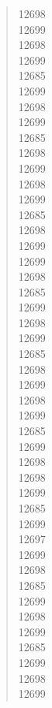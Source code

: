 \documentclass[letterpaper]{article}
\begin{document}
\begin{quote}
{12698\\
12699\\
12698\\
12699\\
12685\\
12699\\
12698\\
12699\\
12685\\
12698\\
12699\\
12698\\
12699\\
12685\\
12698\\
12699\\
12699\\
12698\\
12685\\
12699\\
12698\\
12699\\
12685\\
12698\\
12699\\
12698\\
12699\\
12685\\
12699\\
12698\\
12698\\
12699\\
12685\\
12699\\
12697\\
12699\\
12698\\
12685\\
12699\\
12698\\
12699\\
12685\\
12699\\
12698\\
12699
}
\end{quote}
\end{document}
